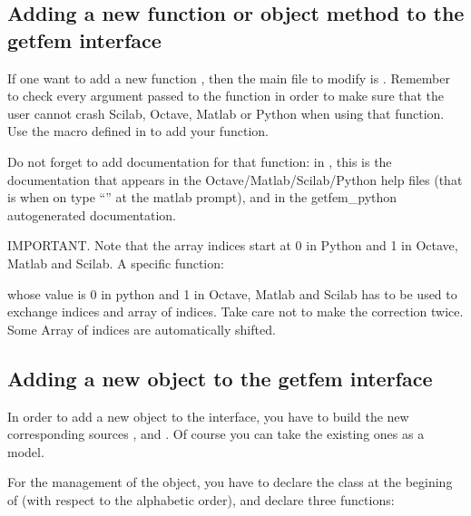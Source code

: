 \documentclass[a4paper,11pt,english]{sphinxmanual}
\begin{document}
\subsection{Adding a new function or object method to the getfem interface}
\label{\detokenize{project/libdesc_interface:adding-a-new-function-or-object-method-to-the-getfem-interface}}
If one want to add a new function , then the
main file to modify is . Remember to check every argument
passed to the function in order to make sure that the user cannot crash Scilab, Octave, Matlab or Python when using that function. Use the macro defined in  to add your function.

Do not forget to add documentation for that function: in ,
this is the documentation that appears in the Octave/Matlab/Scilab/Python help files (that is when on
type “” at the matlab prompt), and in the getfem\_python
autogenerated documentation.

IMPORTANT. Note that the array indices start at 0 in Python and 1 in Octave, Matlab and Scilab. A specific function:

\begin{sphinxVerbatim}[commandchars=\\\{\}]
\end{sphinxVerbatim}

whose value is 0 in python and 1 in Octave, Matlab and Scilab has to be used to exchange indices and array of indices. Take care not to make the correction twice. Some Array of indices are automatically shifted.


\subsection{Adding a new object to the getfem interface}
\label{\detokenize{project/libdesc_interface:adding-a-new-object-to-the-getfem-interface}}
In order to add a new object to the interface, you have to build the new corresponding sources ,  and . Of course you can take the existing ones as a model.

For the management of the object, you have to declare the class at the begining of  (with respect to the alphabetic order), and declare three functions:
\end{document}
